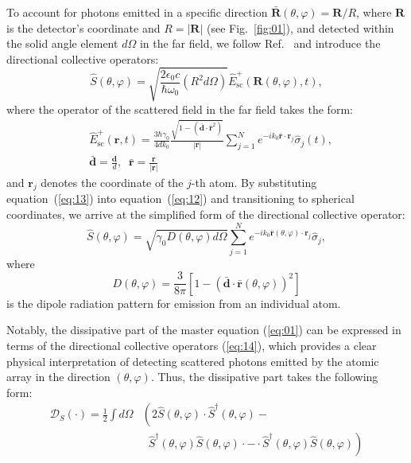 \documentclass[aps,prl,twocolumn,superscriptaddress,showpacs,amsmath,amssymb]{revtex4-2}
\begin{document}
To account for photons emitted in a specific direction $\bar{\mathbf{R}}(\theta, \varphi) = \mathbf{R} / R$, where $\mathbf{R}$ is the detector's coordinate and $R = |\mathbf{R}|$ (see Fig.~\ref{fig:01}), and detected within the solid angle element $d \Omega$ in the far field, we follow
Ref.~\cite{carmichael2000quantum} and introduce the directional collective operators:
\begin{equation}
    \hat{S}(\theta, \varphi) = \sqrt{\frac{2 \epsilon_0 c}{\hbar \omega_0} \left( R^2 d \Omega \right)} \hat{E}_\mathrm{sc}^+ (\mathbf{R}(\theta, \varphi), t),
    \label{eq:12}
\end{equation}
where the operator of the scattered field in the far field takes the form:
\begin{align}
    \label{eq:13}
    &\hat{E}_\mathrm{sc}^+ (\mathbf{r}, t) = \frac{3 \hbar \gamma_0}{4 d k_0} \frac{\sqrt{1 - \left( \bar{\mathbf{d}} \cdot \bar{\mathbf{r}}^2 \right)}}{|\mathbf{r}|} \sum_{j=1}^N e^{-i k_0 \bar{\mathbf{r}} \cdot \mathbf{r}_j} \hat{\sigma}_j(t), \\
    & \bar{\mathbf{d}} = \frac{\mathbf{d}}{d}, \;\; \bar{\mathbf{r}} = \frac{\mathbf{r}}{|\mathbf{r}|} \nonumber
\end{align}
and $\mathbf{r}_j$ denotes the coordinate of the $j$-th atom. By substituting equation~(\ref{eq:13}) into equation~(\ref{eq:12}) and transitioning to spherical coordinates, we arrive at the simplified form of the directional collective operator:
\begin{equation}
    \hat{S}(\theta, \varphi) = \sqrt{\gamma_0 D(\theta, \varphi) d \Omega} \sum_{j=1}^N e^{-i k_0 \bar{\mathbf{r}}(\theta, \varphi) \cdot \mathbf{r}_j} \hat{\sigma}_j,
    \label{eq:14}
\end{equation}
where 
\begin{equation}
    D(\theta, \varphi) = \frac{3}{8 \pi} \left[ 1 - \left( \bar{\mathbf{d}} \cdot \bar{\mathbf{r}}(\theta, \varphi) \right)^2 \right]
    \label{eq:15}
\end{equation}
is the dipole radiation pattern for emission from an individual atom.

Notably, the dissipative part of the master equation (\ref{eq:01}) can be expressed in terms of the directional collective operators (\ref{eq:14}), which provides a clear physical interpretation of detecting scattered photons emitted by the atomic array in the direction $(\theta, \varphi)$. Thus, the dissipative part takes the following form:
\begin{align}
    \label{eq:16}
    \mathcal{D}_S(\cdot) = \frac{1}{2} \int d \Omega & \left( 2 \hat{S}(\theta, \varphi) \cdot \hat{S}^\dagger(\theta, \varphi) - \right. \\
                                                   & \;\; \left. \hat{S}^\dagger(\theta, \varphi)\hat{S}(\theta, \varphi) \cdot - \cdot \hat{S}^\dagger(\theta, \varphi) \hat{S}(\theta, \varphi)\right) \nonumber
\end{align}
\end{document}
